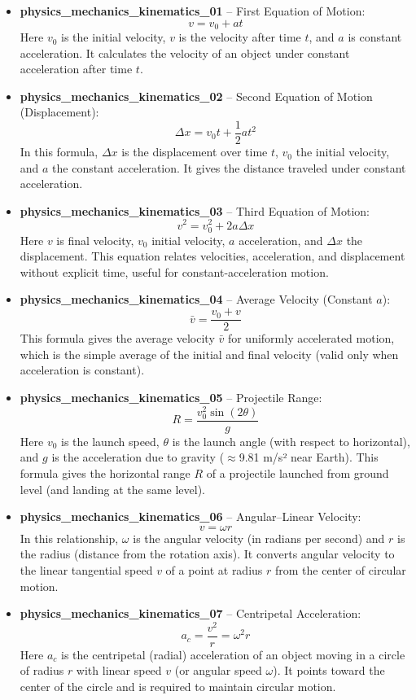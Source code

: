 \documentclass[11pt,a4paper]{article}
\begin{document}
\begin{itemize}
\item \textbf{physics\_mechanics\_kinematics\_01} -- First Equation of Motion: 
\[v = v_0 + at\]
Here $v_0$ is the initial velocity, $v$ is the velocity after time $t$, and $a$ is constant acceleration. It calculates the velocity of an object under constant acceleration after time $t$.

\item \textbf{physics\_mechanics\_kinematics\_02} -- Second Equation of Motion (Displacement): 
\[\Delta x = v_0 t + \frac{1}{2}at^2\]
In this formula, $\Delta x$ is the displacement over time $t$, $v_0$ the initial velocity, and $a$ the constant acceleration. It gives the distance traveled under constant acceleration.

\item \textbf{physics\_mechanics\_kinematics\_03} -- Third Equation of Motion: 
\[v^2 = v_0^2 + 2a\Delta x\]
Here $v$ is final velocity, $v_0$ initial velocity, $a$ acceleration, and $\Delta x$ the displacement. This equation relates velocities, acceleration, and displacement without explicit time, useful for constant-acceleration motion.

\item \textbf{physics\_mechanics\_kinematics\_04} -- Average Velocity (Constant $a$): 
\[\bar{v} = \frac{v_0 + v}{2}\]
This formula gives the average velocity $\bar{v}$ for uniformly accelerated motion, which is the simple average of the initial and final velocity (valid only when acceleration is constant).

\item \textbf{physics\_mechanics\_kinematics\_05} -- Projectile Range: 
\[R = \frac{v_0^2 \sin(2\theta)}{g}\]
Here $v_0$ is the launch speed, $\theta$ is the launch angle (with respect to horizontal), and $g$ is the acceleration due to gravity ($\approx$9.81 m/s² near Earth). This formula gives the horizontal range $R$ of a projectile launched from ground level (and landing at the same level).

\item \textbf{physics\_mechanics\_kinematics\_06} -- Angular--Linear Velocity: 
\[v = \omega r\]
In this relationship, $\omega$ is the angular velocity (in radians per second) and $r$ is the radius (distance from the rotation axis). It converts angular velocity to the linear tangential speed $v$ of a point at radius $r$ from the center of circular motion.

\item \textbf{physics\_mechanics\_kinematics\_07} -- Centripetal Acceleration: 
\[a_c = \frac{v^2}{r} = \omega^2 r\]
Here $a_c$ is the centripetal (radial) acceleration of an object moving in a circle of radius $r$ with linear speed $v$ (or angular speed $\omega$). It points toward the center of the circle and is required to maintain circular motion.
\end{itemize}
\end{document}
